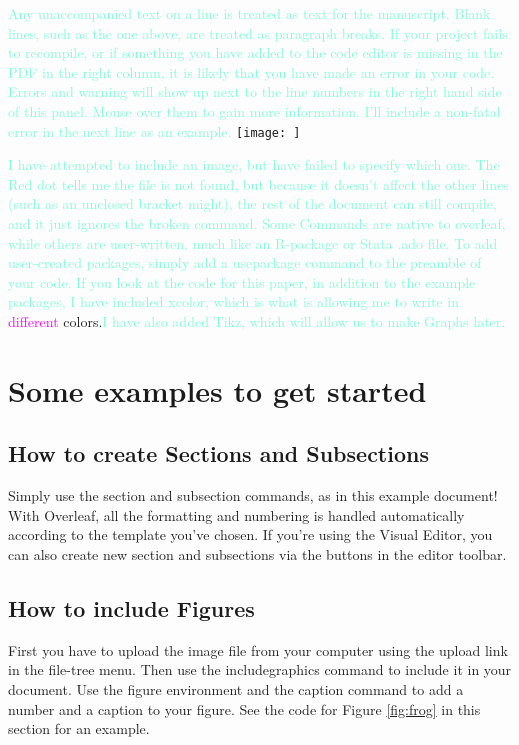 \documentclass{article}
\begin{document}
\textcolor{Aquamarine}{Any unaccompanied text on a line is treated as text for the manuscript. Blank lines, such as the one above, are treated as paragraph breaks. If your project fails to recompile, or if something you have added to the code editor is missing in the PDF in the right column, it is likely that you have made an error in your code. Errors and warning will show up next to the line numbers in the right hand side of this panel. Mouse over them to gain more information. I'll include a non-fatal error in the next line as an example. }
\texttt{[image: ]}

\textcolor{Aquamarine}{I have attempted to include an image, but have failed to specify which one. The Red dot tells me the file is not found, but because it doesn't affect the other lines (such as an unclosed bracket might), the rest of the document can still compile, and it just ignores the broken command. Some Commands are native to overleaf, while others are user-written, much like an R-package or Stata .ado file. To add user-created packages, simply add a usepackage command to the preamble of your code. If you look at the code for this paper, in addition to the example packages, I have included xcolor, which is what is allowing me to write in} \textcolor{Fuchsia}{different} \textcolor{BrickRed}{colors.}\textcolor{Aquamarine}{I have also added Tikz, which will allow us to make Graphs later.}

\section{Some examples to get started}

\subsection{How to create Sections and Subsections}

Simply use the section and subsection commands, as in this example document! With Overleaf, all the formatting and numbering is handled automatically according to the template you've chosen. If you're using the Visual Editor, you can also create new section and subsections via the buttons in the editor toolbar.

\subsection{How to include Figures}

First you have to upload the image file from your computer using the upload link in the file-tree menu. Then use the includegraphics command to include it in your document. Use the figure environment and the caption command to add a number and a caption to your figure. See the code for Figure \ref{fig:frog} in this section for an example.
\end{document}
